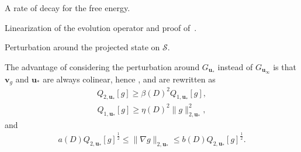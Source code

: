 \documentclass[reqno]{amsart} %
\begin{document}
\begin{section}{A rate of decay for the free energy.}
\begin{section}{Linearization of the evolution operator and proof of~\texorpdfstring{}{thm3}.}
\begin{subsection}{Perturbation around the projected state on \texorpdfstring{$\mathcal{S}$}{S}.}
  
  The advantage of considering the perturbation around $G_{\mathbf{u}_*}$ instead of $G_{\mathbf{u}_{\infty}}$ is that $\mathbf{v}_g$ and $\mathbf{u}_*$ are always colinear, hence ,  and  are rewritten as 
 \begin{align}
 \label{30}
     Q_{2,\mathbf{u}_*}[g]\geq \beta(D)^2Q_{1,\mathbf{u}_*}[g],
 \end{align}
 \begin{align}
 \label{31}
     Q_{1,\mathbf{u}_*}[g]\geq \eta(D)^2\lVert  g\rVert_{2,\mathbf{u}_*}^2,
 \end{align}
and 
 \begin{align}
 \label{32}
        a(D)Q_{2,\mathbf{u}_*}[g]^{\frac{1}{2}}\leq \lVert \nabla g\rVert_{2,\mathbf{u}_*} \leq   b(D) Q_{2,\mathbf{u}_*}[g]^{\frac{1}{2}}.
    \end{align}
 





\end{subsection}
\end{section}
\end{section}
\end{document}
